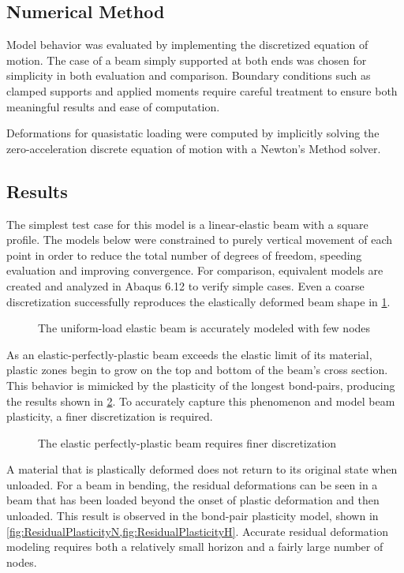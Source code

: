 \documentclass[11pt]{amsart}
\newcommand{\plotpath}{./plots}
\begin{document}
\subsection{Numerical Method}
\label{sec:NumMethod}
Model behavior was evaluated by implementing the discretized equation of motion.
The case of a beam simply supported at both ends was chosen for simplicity in both evaluation and comparison.
Boundary conditions such as clamped supports and applied moments require careful treatment to ensure both meaningful results and ease of computation.

Deformations for quasistatic loading were computed by implicitly solving the zero-acceleration discrete equation of motion with a Newton's Method solver.
%
\subsection{Results}
\label{sec:Results}
The simplest test case for this model is a linear-elastic beam with a square profile.
The models below were constrained to purely vertical movement of each point in order to reduce the total number of degrees of freedom, speeding evaluation and improving convergence.
For comparison, equivalent models are created and analyzed in Abaqus 6.12 to verify simple cases.
Even a coarse discretization successfully reproduces the elastically deformed beam shape in \cref{fig:elastic_g2000}.

\begin{figure}[h]
  \centering
  \scalebox{.6}{}
  \caption{The uniform-load elastic beam is accurately modeled with few nodes}
  \label{fig:elastic_g2000}
\end{figure}

As an elastic-perfectly-plastic beam exceeds the elastic limit of its material, plastic zones begin to grow on the top and bottom of the beam's cross section.
This behavior is mimicked by the plasticity of the longest bond-pairs, producing the results shown in \cref{fig:eppu_h10_g2000}.
To accurately capture this phenomenon and model beam plasticity, a finer discretization is required.
\begin{figure}[h]
  \centering
  \scalebox{.6}{}
  \caption{The elastic perfectly-plastic beam requires finer discretization}
  \label{fig:eppu_h10_g2000}
\end{figure}

A material that is plastically deformed does not return to its original state when unloaded.
For a beam in bending, the residual deformations can be seen in a beam that has been loaded beyond the onset of plastic deformation and then unloaded.
This result is observed in the bond-pair plasticity model, shown in \cref{fig:ResidualPlasticityN,fig:ResidualPlasticityH}. 
Accurate residual deformation modeling requires both a relatively small horizon and a fairly large number of nodes.
\end{document}

